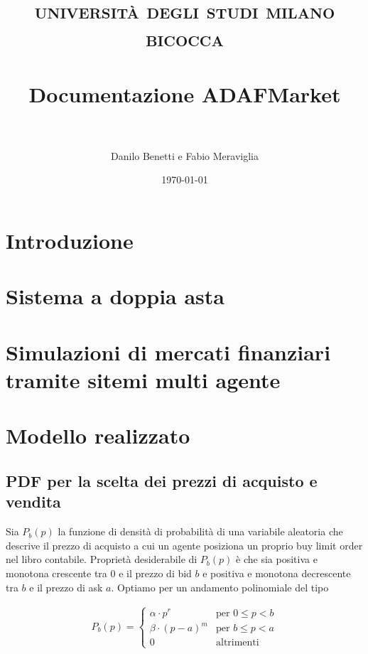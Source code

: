 \documentclass[paper=a4, fontsize=11pt]{scrartcl}
\title{	
\normalfont \normalsize 
\textsc{università degli studi milano bicocca} \\ [25pt]
\horrule{0.5pt} \\ [0.4cm]
\huge Documentazione ADAFMarket \\
\horrule{2pt} \\ [0.5cm]
}
\author{Danilo Benetti e Fabio Meraviglia} %
\date{\normalsize\today} %
\numberwithin{equation}{section}
\numberwithin{figure}{section}
\numberwithin{table}{section}
\begin{document}
\maketitle %


\section{Introduzione}

\section{Sistema a doppia asta}

\section{Simulazioni di mercati finanziari tramite sitemi multi agente}

\section{Modello realizzato}

\subsection{PDF per la scelta dei prezzi di acquisto e vendita}

Sia $P_b(p)$ la funzione di densità di probabilità di una variabile aleatoria che descrive il prezzo di acquisto a cui un agente posiziona un proprio buy limit order nel libro contabile. Proprietà desiderabile di $P_b(p)$ è che sia positiva e monotona crescente tra $0$ e il prezzo di bid $b$ e positiva e monotona decrescente tra $b$ e il prezzo di ask $a$. Optiamo per un andamento polinomiale del tipo

\begin{align}
P_b(p) = \left\{\begin{array}{ll}
         \alpha \cdot p^r     & \text{per } 0 \leq p < b \\
         \beta  \cdot (p-a)^m & \text{per } b \leq p < a \\
         0                    & \text{altrimenti } \end{array}\right.
\end{align}
\end{document}
